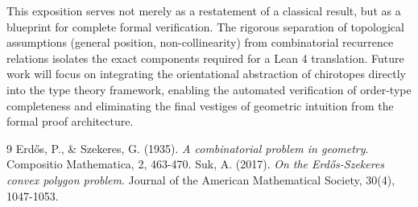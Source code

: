 \documentclass[11pt,a4paper]{article}
\begin{document}
This exposition serves not merely as a restatement of a classical result, but as a blueprint for complete formal verification. The rigorous separation of topological assumptions (general position, non-collinearity) from combinatorial recurrence relations isolates the exact components required for a Lean 4 translation.
Future work will focus on integrating the orientational abstraction of chirotopes directly into the type theory framework, enabling the automated verification of order-type completeness and eliminating the final vestiges of geometric intuition from the formal proof architecture.

\begin{thebibliography}{9}
 Erd\H{o}s, P., \& Szekeres, G. (1935). \textit{A combinatorial problem in geometry}. Compositio Mathematica, 2, 463-470.
 Suk, A. (2017). \textit{On the Erd\H{o}s-Szekeres convex polygon problem}. Journal of the American Mathematical Society, 30(4), 1047-1053.
\end{thebibliography}
\end{document}
